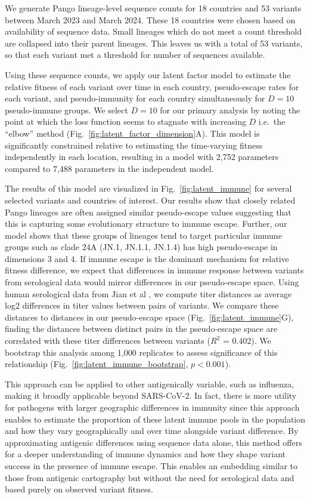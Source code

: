 \documentclass[11pt,oneside,letterpaper]{article}
\begin{document}
We generate Pango lineage-level sequence counts for 18 countries and 53 variants between March 2023 and March 2024.
These 18 countries were chosen based on availability of sequence data.
Small lineages which do not meet a count threshold are collapsed into their parent lineages.
This leaves us with a total of 53 variants, so that each variant met a threshold for number of sequences available.

Using these sequence counts, we apply our latent factor model to estimate the relative fitness of each variant over time in each country, pseudo-escape rates for each variant, and pseudo-immunity for each country simultaneously for $D=10$ pseudo-immune groups.
We select $D=10$ for our primary analysis by noting the point at which the loss function seems to stagnate with increasing $D$ i.e.\ the ``elbow'' method (Fig.~\ref{fig:latent_factor_dimension}A).
This model is significantly constrained relative to estimating the time-varying fitness independently in each location, resulting in a model with 2,752 parameters compared to 7,488 parameters in the independent model.

The results of this model are visualized in Fig.~\ref{fig:latent_immune} for several selected variants and countries of interest.
Our results show that closely related Pango lineages are often assigned similar pseudo-escape values suggesting that this is capturing some evolutionary structure to immune escape.
Further, our model shows that these groups of lineages tend to target particular immune groups such as clade 24A (JN.1, JN.1.1, JN.1.4) has high pseudo-escape in dimensions 3 and 4.
If immune escape is the dominant mechanism for relative fitness difference, we expect that differences in immune response between variants from serological data would mirror differences in our pseudo-escape space.
Using human serological data from Jian et al \cite{Jian2023}, we compute titer distances as average log2 differences in titer values between pairs of variants.
We compare these distances to distances in our pseudo-escape space (Fig.~\ref{fig:latent_immune}G), finding the distances between distinct pairs in the pseudo-escape space are correlated with these titer differences between variants ($R^2$ = 0.402).
We bootstrap this analysis among 1,000 replicates to assess significance of this relationship (Fig.~\ref{fig:latent_immune_bootstrap}, $p < 0.001$).

This approach can be applied to other antigenically variable, such as influenza, making it broadly applicable beyond SARS-CoV-2.
In fact, there is more utility for pathogens with larger geographic differences in immunity since this approach enables to estimate the proportion of these latent immune pools in the population and how they vary geographically and over time alongside variant difference.
By approximating antigenic differences using sequence data alone, this method offers for a deeper understanding of immune dynamics and how they shape variant success in the presence of immune escape.
This enables an embedding similar to those from antigenic cartography but without the need for serological data and based purely on observed variant fitness.
\end{document}
